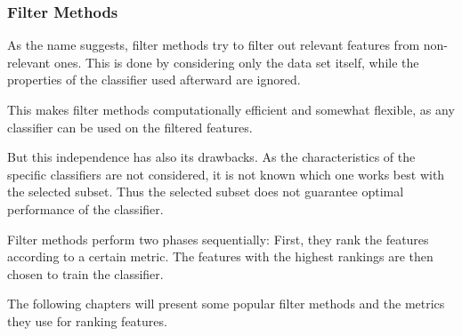 \subsubsection{Filter Methods}
\label{sec:methods.flat.filter}


As the name suggests, filter methods try to filter out relevant features from
non-relevant ones. This is done by considering only the data set itself, while
the properties of the classifier used afterward are ignored.
 
This makes filter methods computationally efficient and somewhat flexible, 
as any classifier can be used on the filtered features.  

But this independence has also its drawbacks. As the characteristics of the 
specific classifiers are not considered, it is not known which one works 
best with the selected subset. Thus the selected subset does not guarantee optimal 
performance of the classifier.

Filter methods perform two phases sequentially: First, they rank the features according 
to a certain metric. The features with the highest rankings are then chosen to train the
classifier. 

The following chapters will present some popular filter methods and the metrics they use
for ranking features.




